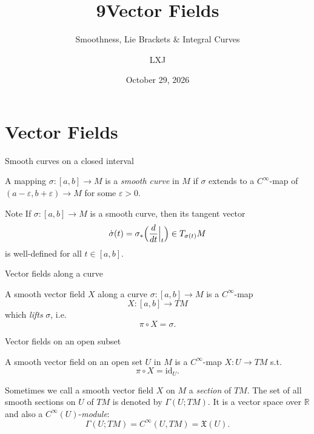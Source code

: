 \documentclass[10pt]{beamer}
\title{9\quad Vector Fields}
\subtitle{Smoothness, Lie Brackets \& Integral Curves}
\date{October 29, 2026}
\author{LXJ}
\newcommand{\R}{\mathbb{R}}
\newcommand{\vX}{\mathfrak{X}}
\begin{document}
\maketitle

\section{Vector Fields}

\begin{frame}{Smooth curves on a closed interval}
	\begin{definition}
		A mapping $\sigma : [a, b] \to M$ is a \emph{smooth curve} in
		$M$ if $\sigma$ extends to a $C^\infty$-map of
		$(a - \varepsilon, b + \varepsilon) \to M$ for some
		$\varepsilon > 0$.
	\end{definition}
	\begin{block}{Note}
		If $\sigma : [a, b] \to M$ is a smooth curve, then its tangent
		vector
		\[
			\dot{\sigma}(t)
			= \sigma_*\Bigl( \frac{d}{dt} \Big|_{t} \Bigr)
			\in T_{\sigma(t)} M
		\]
		is well-defined for all $t \in [a, b]$.
	\end{block}
\end{frame}

\begin{frame}[fragile]{Vector fields along a curve}
	\begin{definition}
		A smooth vector field $X$ along a curve
		$\sigma : [a, b] \to M$ is a $C^\infty$-map
		\[
			X : [a, b] \longrightarrow TM
		\]
		which \emph{lifts} $\sigma$, i.e.
		\[
			\pi \circ X = \sigma .
		\]
	\end{definition}
	\medskip
	\begin{center}
	\end{center}
\end{frame}

\begin{frame}{Vector fields on an open subset}
	\begin{definition}
		A smooth vector field on an open set $U$ in $M$ is a
		$C^\infty$-map $X : U \to TM$ s.t.
		\[
			\pi \circ X = \mathrm{id}_U .
		\]
	\end{definition}
	Sometimes we call a smooth vector field $X$ on $M$ a
	\emph{section} of $TM$. The set of all smooth sections on $U$ of
	$TM$ is denoted by $\Gamma(U; TM)$. It is a vector space over
	$\R$ and also a $C^\infty(U)$-\emph{module}:
	\[
		\Gamma(U; TM) = C^\infty(U, TM) = \vX(U).
	\]
\end{frame}
\end{document}

